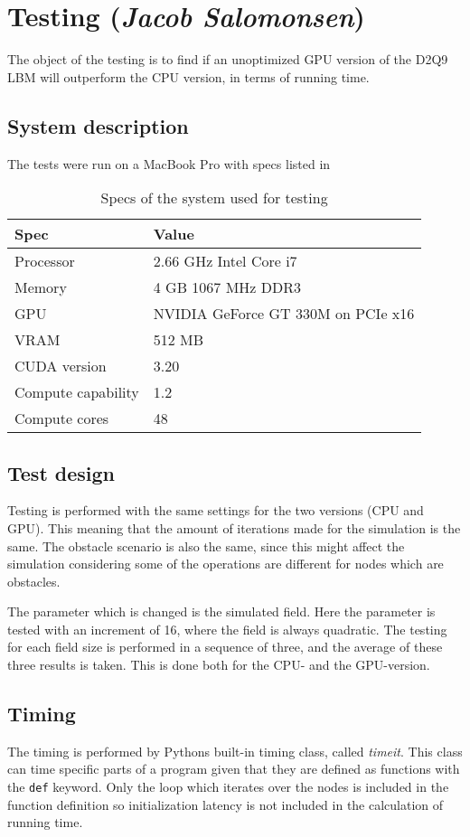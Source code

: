 \section{Testing (\textit{Jacob Salomonsen})}
The object of the testing is to find if an unoptimized GPU version of the D2Q9 LBM will outperform the CPU version, in terms of running time.

\subsection{System description}
The tests were run on a MacBook Pro with specs listed in 

\begin{table}[htb]
	\centering
	\begin{tabular}{ll}
		\toprule
		Spec & Value \\
		\midrule
		Processor & 2.66 GHz Intel Core i7 \\
		Memory & 4 GB 1067 MHz DDR3 \\
		GPU & NVIDIA GeForce GT 330M on PCIe x16\\
		VRAM & 512 MB\\
		CUDA version & 3.20\\
		Compute capability & 1.2\\
		Compute cores & 48\\		
		\bottomrule
	\end{tabular}
	\caption{Specs of the system used for testing}
	\label{specs}
\end{table}

\subsection{Test design}
Testing is performed with the same settings for the two versions (CPU and GPU). This meaning that the amount of iterations made for the simulation is the same. The obstacle scenario is also the same, since this might affect the simulation considering some of the operations are different for nodes which are obstacles. 

The parameter which is changed is the simulated field. Here the parameter is tested with an increment of 16, where the field is always quadratic. The testing for each field size is performed in a sequence of three, and the average of these three results is taken. This is done both for the CPU- and the GPU-version.

\subsection{Timing}
The timing is performed by Pythons built-in timing class, called \textit{timeit}. This class can time specific parts of a program given that they are defined as functions with the \texttt{def} keyword. Only the loop which iterates over the nodes is included in the function definition so initialization latency is not included in the calculation of running time.

